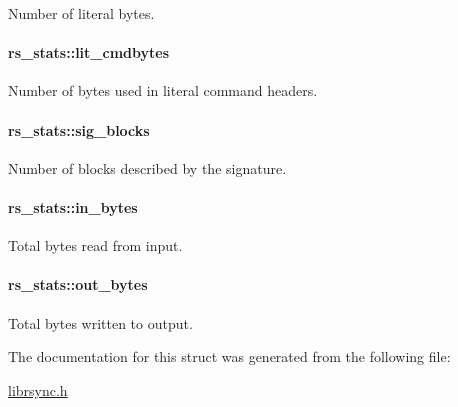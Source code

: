 Number of literal bytes. 

\hypertarget{structrs__stats_30dfcfe89000e028ca4054c8501879fc}{
\paragraph[lit\_\-cmdbytes]{ {\bf rs\_\-stats::lit\_\-cmdbytes}}\hfill}
\label{structrs__stats_30dfcfe89000e028ca4054c8501879fc}


Number of bytes used in literal command headers. 

\hypertarget{structrs__stats_cacc5f67f9babdefed46bf12473c985f}{
\paragraph[sig\_\-blocks]{ {\bf rs\_\-stats::sig\_\-blocks}}\hfill}
\label{structrs__stats_cacc5f67f9babdefed46bf12473c985f}


Number of blocks described by the signature. 

\hypertarget{structrs__stats_fc6c46001cdce8922e443946c4151051}{
\paragraph[in\_\-bytes]{ {\bf rs\_\-stats::in\_\-bytes}}\hfill}
\label{structrs__stats_fc6c46001cdce8922e443946c4151051}


Total bytes read from input. 

\hypertarget{structrs__stats_ce1905d4a0a8d1dfd76a94051afbe571}{
\paragraph[out\_\-bytes]{ {\bf rs\_\-stats::out\_\-bytes}}\hfill}
\label{structrs__stats_ce1905d4a0a8d1dfd76a94051afbe571}


Total bytes written to output. 



The documentation for this struct was generated from the following file:\begin{CompactItemize}
\item 
\hyperlink{librsync_8h}{librsync.h}\end{CompactItemize}
